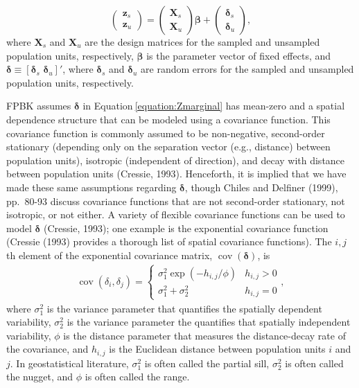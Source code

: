 \documentclass[]{elsarticle} %
\begin{document}
\begin{equation}
\begin{pmatrix} \label{equation:Zmarginal}
    \mathbf{z}_s      \\
    \mathbf{z}_u
\end{pmatrix}
=
\begin{pmatrix}
  \mathbf{X}_s    \\
  \mathbf{X}_u
\end{pmatrix}
\bm{\beta} +
\begin{pmatrix}
\bm{\delta}_s    \\
\bm{\delta}_u
\end{pmatrix},
\end{equation} where \(\mathbf{X}_s\) and \(\mathbf{X}_u\) are the
design matrices for the sampled and unsampled population units,
respectively, \(\bm{\beta}\) is the parameter vector of fixed effects,
and \(\bm{\delta} \equiv [\bm{\delta}_s \,\, \bm{\delta}_u]'\), where
\(\bm{\delta}_s\) and \(\bm{\delta}_u\) are random errors for the
sampled and unsampled population units, respectively.

FPBK assumes \(\bm{\delta}\) in Equation\(~\)\ref{equation:Zmarginal}
has mean-zero and a spatial dependence structure that can be modeled
using a covariance function. This covariance function is commonly
assumed to be non-negative, second-order stationary (depending only on
the separation vector (e.g., distance) between population units),
isotropic (independent of direction), and decay with distance between
population units (Cressie, 1993). Henceforth, it is implied that we have
made these same assumptions regarding \(\bm{\delta}\), though Chiles and
Delfiner (1999), pp.~80-93 discuss covariance functions that are not
second-order stationary, not isotropic, or not either. A variety of
flexible covariance functions can be used to model \(\bm{\delta}\)
(Cressie, 1993); one example is the exponential covariance function
(Cressie (1993) provides a thorough list of spatial covariance
functions). The \(i,j\)th element of the exponential covariance matrix,
\(\mathop{\mathrm{{cov}}}(\bm{\delta})\), is \mbox{}
\begin{align}\label{equation:expcov}
\mathop{\mathrm{{cov}}}(\delta_i, \delta_j) = 
\begin{cases} 
\sigma^2_{1}\exp(-h_{i,j}/\phi) & h_{i,j} > 0 \\
\sigma^2_{1} + \sigma^2_2 & h_{i,j} = 0
\end{cases}
,
\end{align} where \(\sigma^2_{1}\) is the variance parameter that
quantifies the spatially dependent variability, \(\sigma^2_{2}\) is the
variance parameter the quantifies that spatially independent
variability, \(\phi\) is the distance parameter that measures the
distance-decay rate of the covariance, and \(h_{i,j}\) is the Euclidean
distance between population units \(i\) and \(j\). In geostatistical
literature, \(\sigma^2_{1}\) is often called the partial sill,
\(\sigma^2_{2}\) is often called the nugget, and \(\phi\) is often
called the range.
\end{document}
